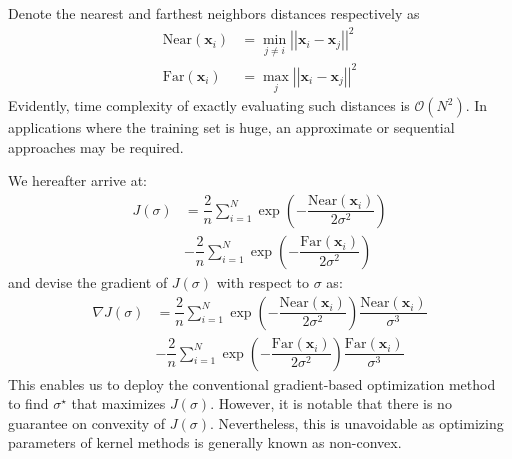 \documentclass[conference]{IEEEtran}
\begin{document}
Denote the nearest  and farthest neighbors distances respectively as 
\begin{subequations}
\begin{align}
\text{Near} \left( \mathbf{x}_i \right)&=\min_{j \ne i} \left|\left| \mathbf{x}_i - \mathbf{x}_j \right|\right|^2 \label{eq:near_dist} \\
\text{Far} \left( \mathbf{x}_i \right)&=\max_j \left|\left| \mathbf{x}_i - \mathbf{x}_j \right|\right|^2 \label{eq:far_dist}
\end{align}
\end{subequations}
Evidently, time complexity of exactly evaluating such distances is $\mathcal{O}(N^2)$. In applications where the training set is huge, an approximate or sequential approaches may be required.

We hereafter arrive at:
\begin{align}
J (\sigma) &=\dfrac{2}{n} \sum _{i=1}^N \exp \left( - \dfrac{\text{Near} \left( \mathbf{x}_i \right)}{2 \sigma^2} \right) \nonumber \\
& - \dfrac{2}{n} \sum _{i=1}^N \exp \left( - \dfrac{\text{Far} \left( \mathbf{x}_i \right)}{2 \sigma^2}\right) \label{eq:Js}
\end{align}
and devise the gradient of $J (\sigma)$ with respect to $\sigma$ as:
\begin{align}
\nabla J  (\sigma) &= \dfrac{2}{n} \sum _{i=1}^N \exp \left( -\dfrac{\text{Near} \left( \mathbf{x}_i \right)}{2 \sigma^2}\right) \dfrac{\text{Near} \left( \mathbf{x}_i \right)}{\sigma^3} \nonumber \\
& - \dfrac{2}{n} \sum _{i=1}^N \exp \left( -\dfrac{\text{Far} \left( \mathbf{x}_i \right)}{2 \sigma^2}\right) \dfrac{\text{Far} \left( \mathbf{x}_i \right)}{\sigma^3} \label{eq:dJds}
\end{align}
This enables us to deploy the conventional gradient-based optimization method to find $\sigma^\star$ that maximizes $J(\sigma)$. However, it is notable that there is no guarantee on convexity of $J(\sigma)$. Nevertheless, this is unavoidable as optimizing parameters of kernel methods is generally known as non-convex. 
\end{document}
